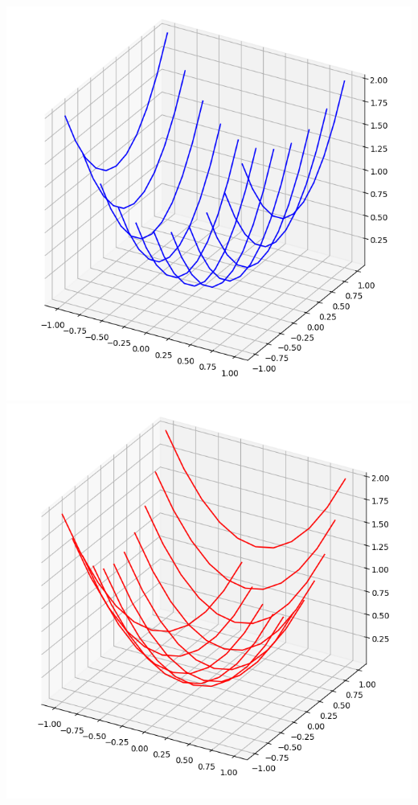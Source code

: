 \documentclass[11pt,class=report,crop=false]{standalone}
\begin{document}
\begin{activite}[Surfaces]
\begin{enumerate}
\begin{enumerate}
	  \begin{center}
	  	\includegraphics[scale=\myscale,scale=0.2]{ecran-surface-7}
	  	\includegraphics[scale=\myscale,scale=0.2]{ecran-surface-8}

\end{center}
\end{enumerate}
\end{enumerate}
\end{activite}
\end{document}
